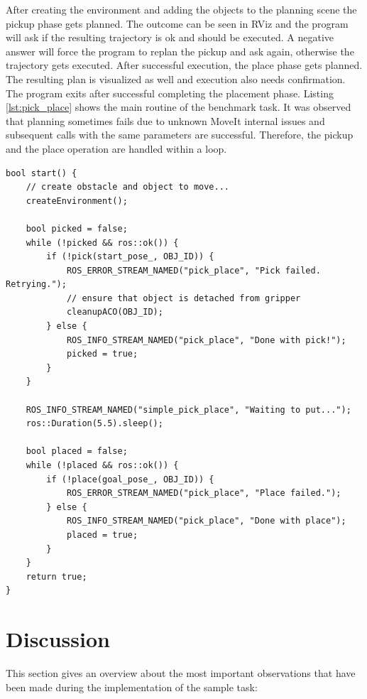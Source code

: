 After creating the environment and adding the objects to the planning scene the pickup phase gets planned. The outcome can be seen in RViz and the program will ask if the resulting trajectory is ok and should be executed. A negative answer will force the program to replan the pickup and ask again, otherwise the trajectory gets executed. After successful execution, the place phase gets planned. The resulting plan is visualized as well and execution also needs confirmation. The program exits after successful completing the placement phase. Listing \ref{lst:pick_place} shows the main routine of the benchmark task. It was observed that planning sometimes fails due to unknown MoveIt internal issues and subsequent calls with the same parameters are successful. Therefore, the pickup and the place operation are handled within a loop. 

\lstset{style=customc}
\begin{minipage}{\linewidth}
\begin{lstlisting}[caption={Benchmark task main routine}, label=lst:pick_place]
bool start() {
	// create obstacle and object to move...
	createEnvironment();

	bool picked = false;
	while (!picked && ros::ok()) {
		if (!pick(start_pose_, OBJ_ID)) {
			ROS_ERROR_STREAM_NAMED("pick_place", "Pick failed. Retrying.");
			// ensure that object is detached from gripper
			cleanupACO(OBJ_ID);
		} else {
			ROS_INFO_STREAM_NAMED("pick_place",	"Done with pick!");
            picked = true;
		}
	}

	ROS_INFO_STREAM_NAMED("simple_pick_place", "Waiting to put...");
	ros::Duration(5.5).sleep();

	bool placed = false;
	while (!placed && ros::ok()) {
		if (!place(goal_pose_, OBJ_ID)) {
			ROS_ERROR_STREAM_NAMED("pick_place", "Place failed.");
		} else {
			ROS_INFO_STREAM_NAMED("pick_place", "Done with place");
			placed = true;
		}
	}
	return true;
}
\end{lstlisting}
\end{minipage}

\section{Discussion}

This section gives an overview about the most important observations that have been made during the implementation of the sample task:

